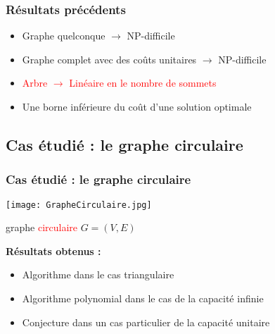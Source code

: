 \begin{frame}[label=PreviousResults]
  \frametitle{Résultats précédents}
  
  \begin{itemize}
  \item Graphe quelconque $\longrightarrow$ NP-difficile
  \item Graphe complet avec des coûts unitaires $\longrightarrow$ NP-difficile
  \item \textcolor{red}{Arbre $\longrightarrow$ Linéaire en le nombre de sommets}
  \item Une borne inférieure du coût d'une solution optimale
  \end{itemize}

\end{frame}

\subsection{Cas étudié : le graphe circulaire}

\begin{frame}[label=GrapheCirculaire]
  \frametitle{Cas étudié : le graphe circulaire}
  
  \begin{center}
  
    \begin{minipage}[c]{.5\linewidth}
      \begin{center}
        \texttt{[image: GrapheCirculaire.jpg]}
        
        graphe \textcolor{red}{circulaire} $G=(V,E)$
      \end{center}
    \end{minipage}\hfill
    \begin{minipage}[c]{.5\linewidth}
      \textbf{Résultats obtenus :}
      \begin{itemize}
      \item Algorithme dans le cas triangulaire
      \item Algorithme polynomial dans le cas de la capacité infinie
      \item Conjecture dans un cas particulier de la capacité unitaire
      \end{itemize}
    \end{minipage}
    
  \end{center}

\end{frame}


